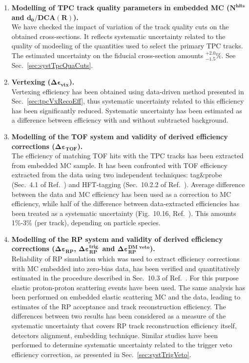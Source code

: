 \begin{enumerate}
 \item \textbf{Modelling of TPC track quality parameters in embedded MC ($\bm{N^{\text{hits}}}$ and $\bm{d_{0}/\text{DCA}(R)}$).}\\
 We have checked the impact of variation of the track quality cuts on the obtained cross-sections. It reflects systematic uncertainty related to the quality of modeeling of the quantities used to select the primary TPC tracks. The estimated uncertainty on the fiducial cross-section amounts $^{+2.0}_{-1.5}\%$. See Sec.~\ref{sec:systTpcQuaCuts}.
 \item \textbf{Vertexing ($\bm{\Delta\epsilon_{\text{vtx}}}$).}\\
 Vertexing efficiency has been obtained using data-driven method presented in Sec.~\ref{sec:tpcVxRecoEff}, thus systematic uncertainty related to this efficiency has been significantly reduced. Systematic uncertainty has been estimated as a difference between efficiency with and without subtracted background.
 \item \textbf{Modelling of the TOF system and validity of derived efficiency corrections ($\bm{\Delta\varepsilon_{\text{TOF}}}$).}\\
 The efficiency of matching TOF hits with the TPC tracks has been extracted from embedded MC sample. It has been confronted with TOF efficiency extracted from the data using two independent techniques: tag\&probe (Sec.~4.1 of Ref.~\cite{supplementaryNote}) and HFT-tagging (Sec.~10.2.2 of Ref.~\cite{supplementaryNote}). Average difference between the data and MC efficiency has been used as a correction to MC efficiency, while half of the difference between data-extracted efficiencies has been treated as a systematic uncertainty (Fig.~10.16, Ref.~\cite{supplementaryNote}). This amounts 1\%-3\% (per track), depending on particle species.
%
 \item \textbf{Modelling of the RP system and validity of derived efficiency corrections ($\bm{\Delta\varepsilon_{\text{RP}}}$, $\bm{\Delta\varepsilon_{\text{RP}}^{\text{trig.}}}$ and $\bm{\Delta\varepsilon_{\text{RP}}^{\text{DM veto}}}$).}\\
 Reliability of RP simulation which was used to extract efficiency corrections with MC embedded into zero-bias data, has been verified and quantitatively estimated in the procedure described in Sec.~10.3 of Ref.~\cite{supplementaryNote}. For this purpose elastic proton-proton scattering events have been used. The same analysis has been performed on embedded elastic scattering MC and the data, leading to estimates of the RP acceptance and track reconstruction efficiency. The differences between two results has been considered as a measure of the systematic uncertainty that covers RP track reconstruction efficiency itself, detectors alignment, embedding technique. Similar studies have been performed to determine systematic uncertainty related to the trigger veto efficiency correction, as presented in Sec.~\ref{sec:systTrigVeto}.

\end{enumerate}
